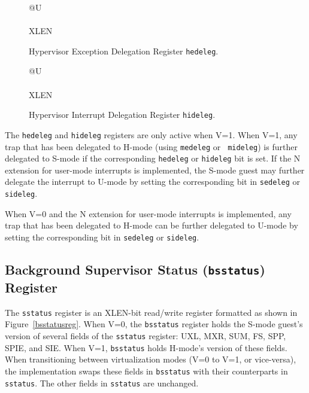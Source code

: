 \begin{figure}[h!]
{\footnotesize
\begin{center}
\begin{tabular}{@{}U}
 \\
\hline
{} \\
\hline
XLEN \\
\end{tabular}
\end{center}
}
\vspace{-0.1in}
\caption{Hypervisor Exception Delegation Register {\tt hedeleg}.}
\label{hedelegreg}
\end{figure}

\begin{figure}[h!]
{\footnotesize
\begin{center}
\begin{tabular}{@{}U}
 \\
\hline
{} \\
\hline
XLEN \\
\end{tabular}
\end{center}
}
\vspace{-0.1in}
\caption{Hypervisor Interrupt Delegation Register {\tt hideleg}.}
\label{hidelegreg}
\end{figure}

The {\tt hedeleg} and {\tt hideleg} registers are only active when V=1.  When
V=1, any trap that has been delegated to H-mode (using {\tt medeleg} or {\tt
mideleg}) is further delegated to S-mode if the corresponding {\tt hedeleg} or
{\tt hideleg} bit is set.  If the N extension for user-mode interrupts
is implemented, the S-mode guest may further delegate the interrupt
to U-mode by setting the corresponding bit in {\tt sedeleg} or {\tt sideleg}.

When V=0 and the N extension for user-mode interrupts is implemented, any trap
that has been delegated to H-mode can be further delegated to U-mode by
setting the corresponding bit in {\tt sedeleg} or {\tt sideleg}.

\subsection{Background Supervisor Status ({\tt bsstatus}) Register}

The {\tt sstatus} register is an XLEN-bit read/write register formatted as
shown in Figure~\ref{bsstatusreg}.  When V=0, the {\tt bsstatus} register
holds the S-mode guest's version of several fields of the {\tt sstatus}
register: UXL, MXR, SUM, FS, SPP, SPIE, and SIE.  When V=1, {\tt bsstatus}
holds H-mode's version of these fields.  When transitioning between
virtualization modes (V=0 to V=1, or vice-versa), the implementation swaps
these fields in {\tt bsstatus} with their counterparts in {\tt sstatus}.  The
other fields in {\tt sstatus} are unchanged.

